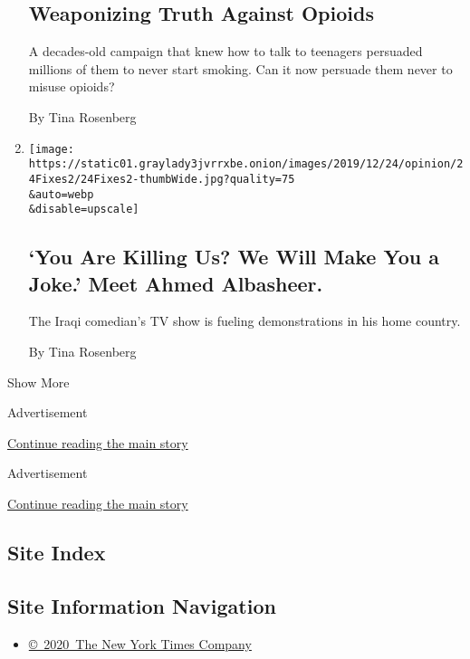 \begin{enumerate}
{  \subsection{Weaponizing Truth Against
  Opioids}\label{weaponizing-truth-against-opioids}}

  A decades-old campaign that knew how to talk to teenagers persuaded
  millions of them to never start smoking. Can it now persuade them
  never to misuse opioids?

  By Tina Rosenberg
\item
  \href{/2019/12/26/opinion/albasheer-show-iraq-political-revolution.html}{}

  \texttt{[image: https://static01.graylady3jvrrxbe.onion/images/2019/12/24/opinion/24Fixes2/24Fixes2-thumbWide.jpg?quality=75\\\&auto=webp\\\&disable=upscale]}

  \hypertarget{you-are-killing-us-we-will-make-you-a-joke-meet-ahmed-albasheer}{%
  \subsection{`You Are Killing Us? We Will Make You a Joke.' Meet Ahmed
  Albasheer.}\label{you-are-killing-us-we-will-make-you-a-joke-meet-ahmed-albasheer}}

  The Iraqi comedian's TV show is fueling demonstrations in his home
  country.

  By Tina Rosenberg
\end{enumerate}

Show More

Advertisement

\protect\hyperlink{after-mid1}{Continue reading the main story}

Advertisement

\protect\hyperlink{after-mktg}{Continue reading the main story}

\hypertarget{site-index}{%
\subsection{Site Index}\label{site-index}}

\hypertarget{site-information-navigation}{%
\subsection{Site Information
Navigation}\label{site-information-navigation}}

\begin{itemize}
\tightlist
\item
  \href{https://help.nytimes3xbfgragh.onion/hc/en-us/articles/115014792127-Copyright-notice}{©~2020~The
  New York Times Company}
\end{itemize}

